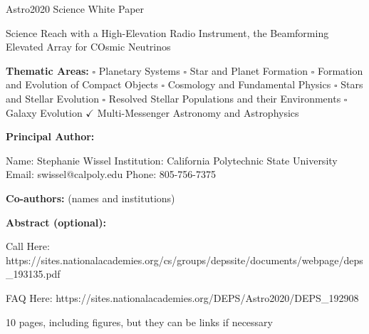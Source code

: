 \documentclass[12pt]{article}
\begin{document}
\raggedright
\huge
Astro2020 Science White Paper \linebreak

Science Reach with a High-Elevation Radio Instrument, the Beamforming Elevated Array for COsmic Neutrinos \linebreak
\normalsize

\noindent \textbf{Thematic Areas:} \hspace*{60pt} $\square$ Planetary Systems \hspace*{10pt} $\square$ Star and Planet Formation \hspace*{20pt}\linebreak
$\square$ Formation and Evolution of Compact Objects \hspace*{31pt} $\square$ Cosmology and Fundamental Physics \linebreak
  $\square$  Stars and Stellar Evolution \hspace*{1pt} $\square$ Resolved Stellar Populations and their Environments \hspace*{40pt} \linebreak
  $\square$    Galaxy Evolution   \hspace*{45pt} $\checkmark$             Multi-Messenger Astronomy and Astrophysics \hspace*{65pt} \linebreak
  
\textbf{Principal Author:}

Name:	Stephanie Wissel
 \linebreak						
Institution:  California Polytechnic State University
 \linebreak
Email: swissel@calpoly.edu
 \linebreak
Phone:  805-756-7375
 \linebreak
 
\textbf{Co-authors:} (names and institutions)
  \linebreak

\textbf{Abstract  (optional):}

\normalsize
\pagebreak


\pagebreak

Call Here:
https://sites.nationalacademies.org/cs/groups/depssite/documents/webpage/deps\_193135.pdf

FAQ Here: 
https://sites.nationalacademies.org/DEPS/Astro2020/DEPS\_192908

10 pages, including figures, but they can be links if necessary
\end{document}
